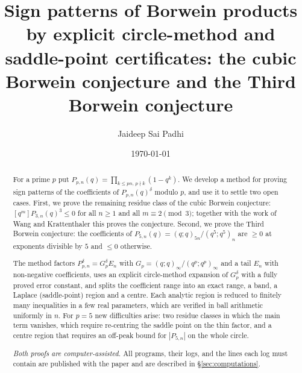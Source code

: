 \documentclass[11pt,reqno]{amsart}
\theoremstyle{plain}
\theoremstyle{definition}
\begin{document}
\title[A method for Borwein-type sign problems]{Sign patterns of Borwein products by explicit circle-method and saddle-point certificates: the cubic Borwein conjecture and the Third Borwein conjecture}
\author{Jaideep Sai Padhi}
\address{Department of Computer Science, Purdue University, West Lafayette, IN 47907, USA}
\date{\today}

\begin{abstract}
For a prime $p$ put $P_{p,n}(q)=\prod_{k\le pn,\,p\nmid k}(1-q^k)$. We develop a method for proving sign patterns of the
coefficients of $P_{p,n}(q)^\delta$ modulo $p$, and use it to settle two open cases. First, we prove the remaining residue
class of the cubic Borwein conjecture: $[q^m]P_{3,n}(q)^3\le0$ for all $n\ge1$ and all $m\equiv2\pmod 3$; together with
the work of Wang and Krattenthaler this proves the conjecture. Second, we prove the Third Borwein conjecture: the
coefficients of $P_{5,n}(q)=(q;q)_{5n}/(q^5;q^5)_n$ are $\ge0$ at exponents divisible by $5$ and $\le0$ otherwise.

The method factors $P_{p,n}^\delta=G_p^\delta E_n$ with $G_p=(q;q)_\infty/(q^p;q^p)_\infty$ and a tail $E_n$ with
non-negative coefficients, uses an explicit circle-method expansion of $G_p^\delta$ with a fully proved error constant, and
splits the coefficient range into an exact range, a band, a Laplace (saddle-point) region and a centre. Each analytic
region is reduced to finitely many inequalities in a few real parameters, which are verified in ball arithmetic uniformly
in $n$. For $p=5$ new difficulties arise: two residue classes in which the main term vanishes, which require re-centring
the saddle point on the thin factor, and a centre region that requires an off-peak bound for $|P_{5,n}|$ on the whole
circle.

\emph{Both proofs are computer-assisted.} All programs, their logs, and the lines each log must contain are published
with the paper and are described in \S\ref{sec:computations}.
\end{abstract}

\maketitle
\setcounter{tocdepth}{1}
\tableofcontents







\appendix





\end{document}
